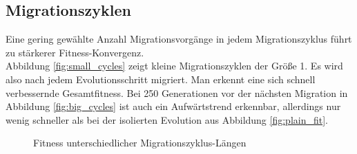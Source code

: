 \documentclass[12pt,a4paper]{article}
\begin{document}
\subsection{Migrationszyklen}
Eine gering gewählte Anzahl Migrationsvorgänge in jedem Migrationszyklus führt zu stärkerer Fitness-Konvergenz.\\
Abbildung \ref{fig:small_cycles} zeigt kleine Migrationszyklen der Größe 1. Es wird also nach jedem Evolutionsschritt migriert. Man erkennt eine sich schnell verbessernde Gesamtfitness. Bei 250 Generationen vor der nächsten Migration in Abbildung \ref{fig:big_cycles} ist auch ein Aufwärtstrend erkennbar, allerdings nur wenig schneller als bei der isolierten Evolution aus Abbildung \ref{fig:plain_fit}.
\begin{figure}
\centering
{}
\caption{Fitness unterschiedlicher Migrationszyklus-Längen}
\end{figure}
\end{document}
